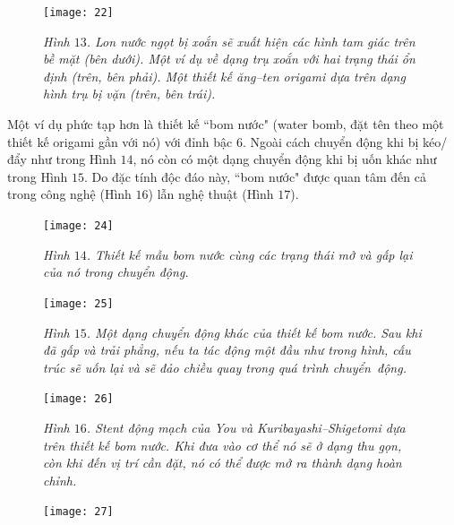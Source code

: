 \begin{multicols}{2}
\begin{figure}[H]
		\vspace*{4pt}
		\texttt{[image: 22]}
		\caption{\small\textit{\color{toanhocdoisong}Hình $13$. Lon nước ngọt bị xoắn sẽ xuất hiện các hình tam giác trên bề mặt (bên dưới). Một ví dụ về dạng trụ xoắn với hai trạng thái ổn định (trên, bên phải). Một thiết kế ăng--ten origami dựa trên dạng hình trụ bị vặn (trên, bên trái).}}
		\vspace*{-10pt}
	\end{figure}
	Một ví dụ phức tạp hơn là thiết kế ``bom nước" (water bomb, đặt tên theo một thiết kế origami gần với nó) với đỉnh bậc $6$. Ngoài cách chuyển động khi bị kéo/đẩy như  trong Hình $14$, nó còn có một dạng chuyển động khi bị uốn khác như trong Hình $15$. Do đặc tính độc đáo này, ``bom nước" được quan tâm đến cả trong công nghệ (Hình $16$) lẫn nghệ thuật (Hình $17$).  
	\begin{figure}[H]
		\vspace*{-5pt}
		\centering
		\captionsetup{labelformat= empty, justification=centering}
		\texttt{[image: 24]}
		\caption{\small\textit{\color{toanhocdoisong}Hình $14$. Thiết kế mẫu bom nước cùng các trạng thái mở và gấp lại của nó trong chuyển động.}}
		\vspace*{-5pt}
	\end{figure}
	\begin{figure}[H]
		\centering
		\captionsetup{labelformat= empty, justification=centering}
		\texttt{[image: 25]}
		\caption{\small\textit{\color{toanhocdoisong}Hình $15$. Một dạng chuyển động khác của thiết kế bom nước. Sau khi đã gấp và trải phẳng, nếu ta tác động một đầu như trong hình, cấu trúc sẽ uốn lại và sẽ đảo chiều quay trong quá trình chuyển~động.}}
		\vspace*{-10pt}
	\end{figure}
	\begin{figure}[H]
		\vspace*{-10pt}
		\centering
		\captionsetup{labelformat= empty, justification=centering}
		\texttt{[image: 26]}
		\caption{\small\textit{\color{toanhocdoisong}Hình $16$. Stent động mạch của You và Kuribayashi--Shigetomi dựa trên thiết kế bom nước. Khi đưa vào cơ thể nó sẽ ở dạng thu gọn, còn khi đến vị trí cần đặt, nó có thể được mở ra thành dạng hoàn chỉnh.}}
		\vspace*{-10pt}
	\end{figure}
	\begin{figure}[H]
		\vspace*{-10pt}
		\centering
		\captionsetup{labelformat= empty, justification=centering}
		\texttt{[image: 27]}
		

\end{figure}
\end{multicols}
